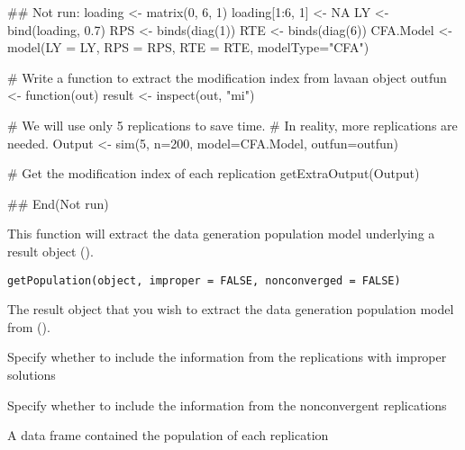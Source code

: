 \documentclass[a4paper]{book}
\begin{document}
\begin{Examples}
\begin{ExampleCode}
## Not run: 
loading <- matrix(0, 6, 1)
loading[1:6, 1] <- NA
LY <- bind(loading, 0.7)
RPS <- binds(diag(1))
RTE <- binds(diag(6))
CFA.Model <- model(LY = LY, RPS = RPS, RTE = RTE, modelType="CFA")

# Write a function to extract the modification index from lavaan object
outfun <- function(out) {
	result <- inspect(out, "mi")
}

# We will use only 5 replications to save time.
# In reality, more replications are needed.
Output <- sim(5, n=200, model=CFA.Model, outfun=outfun)

# Get the modification index of each replication
getExtraOutput(Output)

## End(Not run)
\end{ExampleCode}
\end{Examples}
%
\begin{Description}\relax
This function will extract the data generation population model underlying a result object ().
\end{Description}
%
\begin{Usage}
\begin{verbatim}
getPopulation(object, improper = FALSE, nonconverged = FALSE)
\end{verbatim}
\end{Usage}
%
\begin{Arguments}
\begin{ldescription}
\item[\code{object}] 
The result object that you wish to extract the data generation population model from ().

\item[\code{improper}] 
Specify whether to include the information from the replications with improper solutions

\item[\code{nonconverged}] 
Specify whether to include the information from the nonconvergent replications

\end{ldescription}
\end{Arguments}
%
\begin{Value}
A data frame contained the population of each replication
\end{Value}
\end{document}
